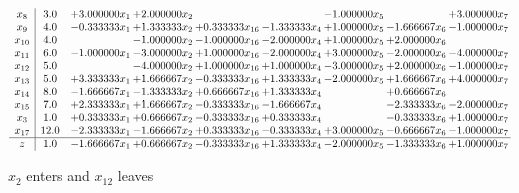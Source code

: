 \documentclass[10pt]{article}
\begin{document}
 \[\begin{array}{c| c c@{\hskip 2pt} c@{\hskip 2pt} c@{\hskip 2pt} c@{\hskip 2pt} c@{\hskip 2pt} c@{\hskip 2pt} c@{\hskip 2pt} }
 x_{8}   &  3.0 & + 3.000000 x_{1} & + 2.000000 x_{2} &    &   & -1.000000 x_{5} &   & + 3.000000 x_{7}\\
 x_{9}   &  4.0 & -0.333333 x_{1} & + 1.333333 x_{2} & + 0.333333 x_{16} & -1.333333 x_{4} & + 1.000000 x_{5} & -1.666667 x_{6} & -1.000000 x_{7}\\
 x_{10}   &  4.0  &   & -1.000000 x_{2} & -1.000000 x_{16} & -2.000000 x_{4} & + 1.000000 x_{5} & + 2.000000 x_{6} &   \\
 x_{11}   &  6.0 & -1.000000 x_{1} & -3.000000 x_{2} & + 1.000000 x_{16} & -2.000000 x_{4} & + 3.000000 x_{5} & -2.000000 x_{6} & -4.000000 x_{7}\\
 x_{12}   &  5.0  &   & -4.000000 x_{2} & + 1.000000 x_{16} & + 1.000000 x_{4} & -3.000000 x_{5} & + 2.000000 x_{6} & -1.000000 x_{7}\\
 x_{13}   &  5.0 & + 3.333333 x_{1} & + 1.666667 x_{2} & -0.333333 x_{16} & + 1.333333 x_{4} & -2.000000 x_{5} & + 1.666667 x_{6} & + 4.000000 x_{7}\\
 x_{14}   &  8.0 & -1.666667 x_{1} & -1.333333 x_{2} & + 0.666667 x_{16} & + 1.333333 x_{4} &   & + 0.666667 x_{6} &   \\
 x_{15}   &  7.0 & + 2.333333 x_{1} & + 1.666667 x_{2} & -0.333333 x_{16} & -1.666667 x_{4} &   & -2.333333 x_{6} & -2.000000 x_{7}\\
 x_{3}   &  1.0 & + 0.333333 x_{1} & + 0.666667 x_{2} & -0.333333 x_{16} & + 0.333333 x_{4} &   & -0.333333 x_{6} & + 1.000000 x_{7}\\
 x_{17}   &  12.0 & -2.333333 x_{1} & -1.666667 x_{2} & + 0.333333 x_{16} & -0.333333 x_{4} & + 3.000000 x_{5} & -0.666667 x_{6} & -1.000000 x_{7}\\
\hline
z    &  1.0 & -1.666667 x_{1} & + 0.666667 x_{2} & -0.333333 x_{16} & + 1.333333 x_{4} & -2.000000 x_{5} & -1.333333 x_{6} & + 1.000000 x_{7}\\
\end{array}\]


 $ x_{2} $ enters and $ x_{12} $ leaves 
\end{document}
